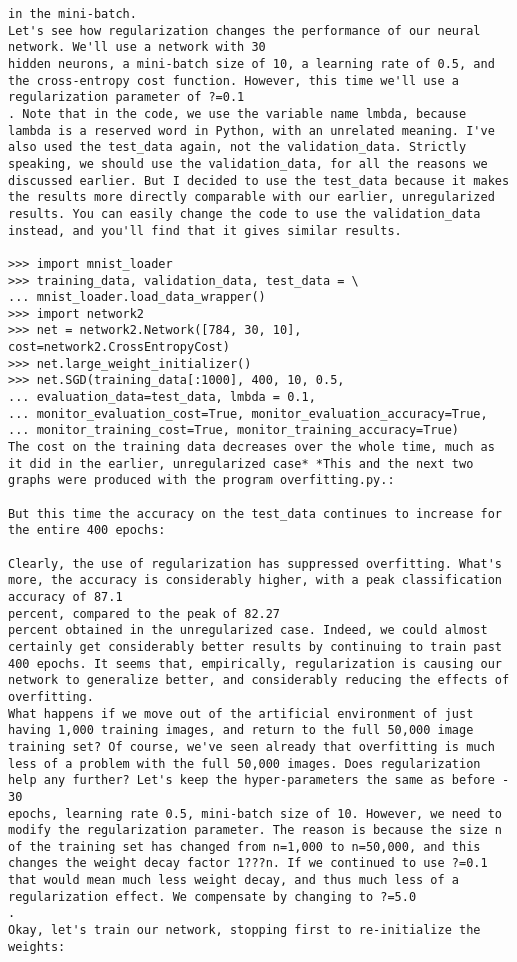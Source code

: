 \begin{lstlisting}
in the mini-batch.
Let's see how regularization changes the performance of our neural network. We'll use a network with 30
hidden neurons, a mini-batch size of 10, a learning rate of 0.5, and the cross-entropy cost function. However, this time we'll use a regularization parameter of ?=0.1
. Note that in the code, we use the variable name lmbda, because lambda is a reserved word in Python, with an unrelated meaning. I've also used the test_data again, not the validation_data. Strictly speaking, we should use the validation_data, for all the reasons we discussed earlier. But I decided to use the test_data because it makes the results more directly comparable with our earlier, unregularized results. You can easily change the code to use the validation_data instead, and you'll find that it gives similar results. 
 
>>> import mnist_loader 
>>> training_data, validation_data, test_data = \
... mnist_loader.load_data_wrapper() 
>>> import network2 
>>> net = network2.Network([784, 30, 10], cost=network2.CrossEntropyCost)
>>> net.large_weight_initializer()
>>> net.SGD(training_data[:1000], 400, 10, 0.5,
... evaluation_data=test_data, lmbda = 0.1,
... monitor_evaluation_cost=True, monitor_evaluation_accuracy=True,
... monitor_training_cost=True, monitor_training_accuracy=True)
The cost on the training data decreases over the whole time, much as it did in the earlier, unregularized case* *This and the next two graphs were produced with the program overfitting.py.:

But this time the accuracy on the test_data continues to increase for the entire 400 epochs:

Clearly, the use of regularization has suppressed overfitting. What's more, the accuracy is considerably higher, with a peak classification accuracy of 87.1
percent, compared to the peak of 82.27
percent obtained in the unregularized case. Indeed, we could almost certainly get considerably better results by continuing to train past 400 epochs. It seems that, empirically, regularization is causing our network to generalize better, and considerably reducing the effects of overfitting.
What happens if we move out of the artificial environment of just having 1,000 training images, and return to the full 50,000 image training set? Of course, we've seen already that overfitting is much less of a problem with the full 50,000 images. Does regularization help any further? Let's keep the hyper-parameters the same as before - 30
epochs, learning rate 0.5, mini-batch size of 10. However, we need to modify the regularization parameter. The reason is because the size n of the training set has changed from n=1,000 to n=50,000, and this changes the weight decay factor 1???n. If we continued to use ?=0.1 that would mean much less weight decay, and thus much less of a regularization effect. We compensate by changing to ?=5.0
.
Okay, let's train our network, stopping first to re-initialize the weights: 
 

\end{lstlisting}
